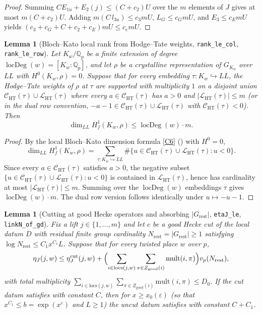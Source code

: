 \documentclass[11pt]{amsart}
\newcommand{\Q}{\mathbb{Q}}
\newcommand{\eps}{\varepsilon}
\theoremstyle{plain}
\newtheorem{lemma}[theorem]{Lemma}
\theoremstyle{definition}
\numberwithin{equation}{section}
\begin{document}
\begin{proof}
Summing $C E_{1u}+E_2(j)\le (C+c_2)U$ over the $m$ elements of $J$ gives at most $m(C+c_2)U$.
Adding $m(C\,l_{3u})\le c_3 mU$, $L_G\le c_G mU$, and $E_3\le c_E mU$ yields
$(c_3+c_G+C+c_2+c_E)mU\le c_e mU$.
\end{proof}

\begin{lemma}[Bloch--Kato local rank from Hodge--Tate weights, \texttt{rank\_le\_col}, \texttt{rank\_le\_row}]\label{lem:ranklerow}
Let $K_w/\Q_p$ be a finite extension of degree $\operatorname{locDeg}(w)=[K_w:\Q_p]$, and let $\rho$
be a crystalline representation of $G_{K_w}$ over $LL$ with $H^0(K_w,\rho)=0$. Suppose that for
every embedding $\tau:K_w\hookrightarrow LL$, the Hodge--Tate weights of $\rho$ at $\tau$ are
supported with multiplicity $1$ on a disjoint union $\mathcal C_{\mathrm{HT}}(\tau)\cup\mathcal L_{\mathrm{HT}}(\tau)$
where every $a\in\mathcal C_{\mathrm{HT}}(\tau)$ has $a>0$ and $|\mathcal L_{\mathrm{HT}}(\tau)|\le m$
(or in the dual row convention, $-a-1\in\mathcal C_{\mathrm{HT}}(\tau)\cup\mathcal L_{\mathrm{HT}}(\tau)$
with $\mathcal C_{\mathrm{HT}}(\tau)<0$). Then
\[
\dim_{LL} H^1_f(K_w,\rho)\le \operatorname{locDeg}(w)\cdot m.
\]
\end{lemma}

\begin{proof}
By the local Bloch--Kato dimension formula \ref{C6} () with $H^0=0$,
\[
\dim_{LL} H^1_f(K_w,\rho)=\sum_{\tau:K_w\hookrightarrow LL}
\#\bigl\{u\in\mathcal C_{\mathrm{HT}}(\tau)\cup\mathcal L_{\mathrm{HT}}(\tau):u<0\bigr\}.
\]
Since every $a\in\mathcal C_{\mathrm{HT}}(\tau)$ satisfies $a>0$, the negative subset
$\{u\in\mathcal C_{\mathrm{HT}}(\tau)\cup\mathcal L_{\mathrm{HT}}(\tau):u<0\}$ is contained in
$\mathcal L_{\mathrm{HT}}(\tau)$, hence has cardinality at most $|\mathcal L_{\mathrm{HT}}(\tau)|\le m$.
Summing over the $\operatorname{locDeg}(w)$ embeddings $\tau$ gives $\operatorname{locDeg}(w)\cdot m$.
The dual row version follows identically under $u\mapsto -u-1$.
\end{proof}

\begin{lemma}[Cutting at good Hecke operators and absorbing $|G_{\mathrm{rest}}|$, \texttt{etaJ\_le}, \texttt{linkN\_of\_gd}]\label{lem:linkNgd}
Fix a lift $j\in\{1,\dots,m\}$ and let $c$ be a good Hecke cut of the local datum $D$ with
residual finite group cardinality $N_{\mathrm{rest}}=|G_{\mathrm{rest}}|\ge1$ satisfying
$\log N_{\mathrm{rest}}\le C_1 x^{C_1} L$. Suppose that for every twisted place $w$ over $p$,
\[
\eta_J(j,w)\le\eta_J^{\mathrm{cut}}(j,w)
+\Bigl(\sum_{i\in\mathrm{locs}(j,w)}\sum_{\pi\in Z_{\mathrm{good}}(i)}\mathrm{mult}(i,\pi)\Bigr)
v_p(N_{\mathrm{rest}}),
\]
with total multiplicity $\sum_{i\in\mathrm{locs}(j,w)}\sum_{\pi\in Z_{\mathrm{good}}(i)}\mathrm{mult}(i,\pi)\le D_0$.
If the cut datum satisfies  with constant $C$, then for $x\ge x_0(\eps)$ (so that
$x^{C_1}\le b=\exp(x^\eps)$ and $L\ge1$) the uncut datum satisfies  with constant
$C+C_1$.
\end{lemma}
\end{document}
